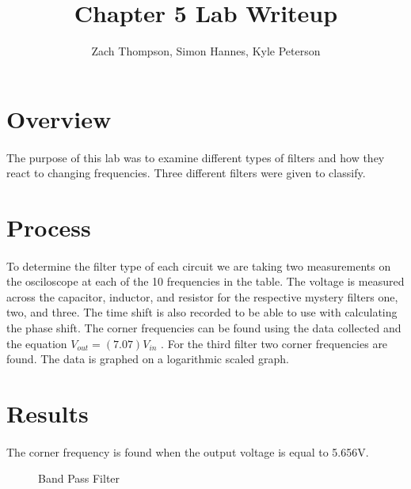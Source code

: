 \documentclass{article}
\title{Chapter 5 Lab Writeup}
\author{Zach Thompson, Simon Hannes, Kyle Peterson}
\begin{document}
\maketitle{}

\section*{Overview}
\paragraph{}
The purpose of this lab was to examine different types of filters and how they react to changing frequencies.
Three different filters were given to classify.



\section*{Process}
\paragraph{}
To determine the filter type of each circuit we are taking two measurements on the osciloscope at each of the 
10 frequencies in the table. The voltage is measured across the capacitor, inductor, and resistor for the 
respective mystery filters one, two, and three. The time shift is also recorded to be able to use with 
calculating the phase shift. The corner frequencies can be found using the data collected and the equation 
$ V_{out} = (7.07)   V_{in}$ . For the third filter two corner frequencies are found. The data is graphed on 
a logarithmic scaled graph.

\section*{Results}
\paragraph{}
The corner frequency is found when the output voltage is equal to 5.656V.

\begin{figure}[!ht]
\caption{Band Pass Filter}
\begin{center}

\end{center}
\end{figure}
\end{document}
